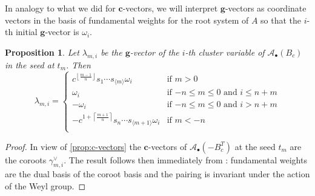 \documentclass[11pt]{amsart}
\newcommand{\cAb}{\mathcal{A}_\bullet}
\newcommand{\bfc}{\mathbf{c}}
\newcommand{\bfg}{\mathbf{g}}
\renewcommand{\mod}[1]{\langle {#1} \rangle}
\newtheorem{proposition}[theorem]{Proposition}
\numberwithin{equation}{section}
\begin{document}
In analogy to what we did for $\bfc$-vectors, we will interpret $\bfg$-vectors as coordinate vectors in the basis of fundamental weights for the root system of $A$ so that the $i$-th initial $\bfg$-vector is $\omega_i$.
\begin{proposition}
  \label{prop:g-vectors}
  Let $\lambda_{m,i}$ be the $\bfg$-vector of the $i$-th cluster variable of $\cAb(B_c)$ in the seed at $t_m$. 
  Then
  \begin{equation}
    \lambda_{m,i}
    =
    \begin{cases}
      c^{\left\lfloor\frac{m-1}{n}\right\rfloor}s_1\cdots s_{\mod{m}} \omega_i & \text{if $m>0$}\\
      \omega_i & \text{if $-n\leq m \leq 0$ and  $i\leq n+m$} \\
      -\omega_i & \text{if $-n\leq m \leq 0$ and $i>n+m$} \\
      -c^{1+\left\lceil\frac{m+1}{n}\right\rceil}s_n\cdots s_{\mod{m+1}} \omega_i & \text{if $m <-n$}\\
    \end{cases}
  \end{equation}
\end{proposition}

\begin{proof}
  In view of \cref{prop:c-vectors} the $\bfc$-vectors of $\cAb(-B_c^T)$ at the seed $t_m$ are the coroots $\gamma_{m,i}^\vee$.
  The result follows then immediately from \cite[Theorem 1.2]{NZ12}: fundamental weights are the dual basis of the coroot basis and the pairing is invariant under the action of the Weyl group.
\end{proof}
\end{document}
